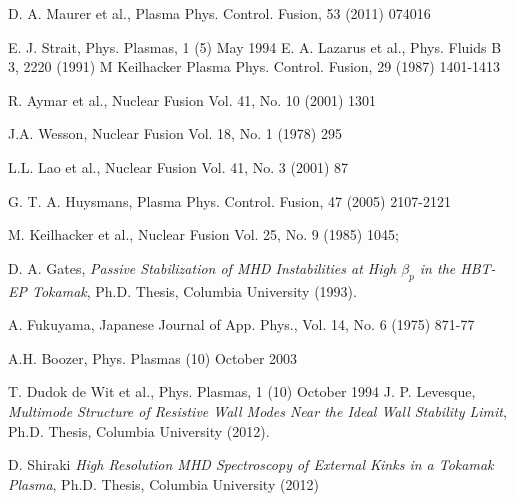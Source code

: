 \documentclass[aps,preprint,showpacs,superscriptaddress,groupedaddress]{revtex4}  %
\begin{document}
\begin{thebibliography}{99}

 D. A. Maurer et al., Plasma Phys. Control. Fusion, 53 (2011) 074016

 E. J. Strait, Phys. Plasmas, 1 (5) May 1994
 E. A. Lazarus et al., Phys. Fluids B 3, 2220 (1991)
 M Keilhacker Plasma Phys. Control. Fusion, 29 (1987) 1401-1413

 R. Aymar et al., Nuclear Fusion Vol. 41, No. 10 (2001) 1301

 J.A. Wesson, Nuclear Fusion Vol. 18, No. 1 (1978) 295

 L.L. Lao et al., Nuclear Fusion Vol. 41, No. 3 (2001) 87

 G. T. A. Huysmans, Plasma Phys. Control. Fusion, 47 (2005) 2107-2121 

 M. Keilhacker et al., Nuclear Fusion Vol. 25, No. 9 (1985) 1045;

 D. A. Gates, \emph{Passive Stabilization of MHD Instabilities at High ${\beta_p}$ in the HBT-EP Tokamak}, Ph.D. Thesis, Columbia University (1993).

 A. Fukuyama, Japanese Journal of App. Phys., Vol. 14, No. 6 (1975) 871-77 

 A.H. Boozer, Phys. Plasmas (10) October 2003


 T. Dudok de Wit et al., Phys. Plasmas, 1 (10) October 1994
 J. P. Levesque, \emph{Multimode Structure of Resistive Wall Modes Near the Ideal Wall Stability Limit}, Ph.D. Thesis, Columbia University (2012).

 D. Shiraki \emph{High Resolution MHD Spectroscopy of External Kinks in a Tokamak Plasma}, Ph.D. Thesis, Columbia University (2012)

\end{thebibliography}
\end{document}
